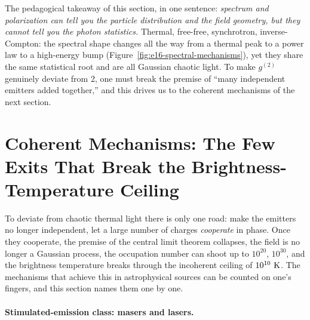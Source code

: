 The pedagogical takeaway of this section, in one sentence: \emph{spectrum and polarization can tell you the particle distribution and the field geometry, but they cannot tell you the photon statistics.} Thermal, free-free, synchrotron, inverse-Compton: the spectral shape changes all the way from a thermal peak to a power law to a high-energy bump (Figure~\ref{fig:e16-spectral-mechanisms}), yet they share the same statistical root and are all Gaussian chaotic light. To make \(g^{(2)}\) genuinely deviate from 2, one must break the premise of ``many independent emitters added together,'' and this drives us to the coherent mechanisms of the next section.

\section{Coherent Mechanisms: The Few Exits That Break the Brightness-Temperature Ceiling}
\label{sec:e16-coherent}

To deviate from chaotic thermal light there is only one road: make the emitters no longer independent, let a large number of charges \emph{cooperate} in phase. Once they cooperate, the premise of the central limit theorem collapses, the field is no longer a Gaussian process, the occupation number can shoot up to \(10^{20}\), \(10^{30}\), and the brightness temperature breaks through the incoherent ceiling of \(10^{10}~{\rm K}\). The mechanisms that achieve this in astrophysical sources can be counted on one's fingers, and this section names them one by one.

\paragraph{Stimulated-emission class: masers and lasers.}
\label{sec:e16-maser}

